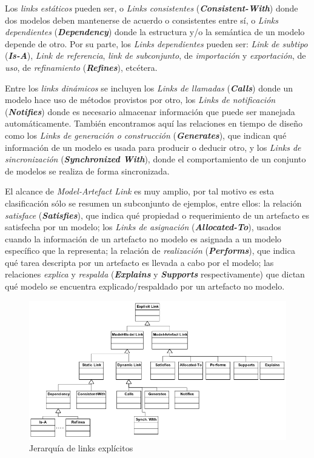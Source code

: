 \documentclass[a4paper,12pt,oneside,spanish]{book}
\begin{document}
Los \textit{links estáticos} pueden ser, o \textit{Links consistentes} (\textit{\textbf{Consistent-With}}) donde dos modelos deben mantenerse de acuerdo o consistentes entre sí, o \textit{Links dependientes} (\textit{\textbf{Dependency}}) donde la estructura y/o la semántica de un modelo depende de otro. Por su parte, los \textit{Links dependientes} pueden ser: \textit{Link de subtipo} (\textit{\textbf{Is-A}}), \textit{Link de referencia}, \textit{link de subconjunto}, de \textit{importación} y \textit{exportación}, de \textit{uso}, de \textit{refinamiento} (\textit{\textbf{Refines}}), etcétera.

Entre los \textit{links dinámicos} se incluyen los \textit{Links de llamadas} (\textit{\textbf{Calls}}) donde un modelo hace uso de métodos provistos por otro, los \textit{Links de notificación} (\textit{\textbf{Notifies}}) donde es necesario almacenar información que puede ser manejada automáticamente. También encontramos aquí las relaciones en tiempo de diseño como los \textit{Links de generación o construcción} (\textit{\textbf{Generates}}), que indican qué información de un modelo es usada para producir o deducir otro, y los \textit{Links de sincronización} (\textit{\textbf{Synchronized With}}), donde el comportamiento de un conjunto de modelos se realiza de forma sincronizada.

El alcance de \textit{Model-Artefact Link} es muy amplio, por tal motivo es esta clasificación sólo se resumen un subconjunto de ejemplos, entre ellos: la relación \textit{satisface} (\textit{\textbf{Satisfies}}), que indica qué propiedad o requerimiento de un artefacto es satisfecha por un modelo; los \textit{Links de asignación} (\textit{\textbf{Allocated-To}}), usados cuando la información de un artefacto no modelo es asignada a un modelo específico que la representa; la relación de \textit{realización} (\textit{\textbf{Performs}}), que indica qué tarea descripta por un artefacto es llevada a cabo por el modelo; las relaciones \textit{explica} y \textit{respalda} (\textit{\textbf{Explains}} y \textit{\textbf{Supports}} respectivamente) que dictan qué modelo se encuentra explicado/respaldado por un artefacto no modelo.

\begin{figure}[hbtp]
\centering
\includegraphics[scale=0.51]{./img/ExplicitTraceLinks}
\caption{Jerarquía de links explícitos}
\label{fig:LinksExplicitos}
\end{figure}
\end{document}
